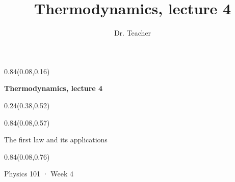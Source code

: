 \documentclass[aspectratio=169]{beamer}
\title{Thermodynamics, lecture 4}
\author{Dr. Teacher}
\begin{document}
\begin{frame}[t]

\begin{textblock}{0.84}(0.08,0.16)
{\centering\fontsize{32}{38}\selectfont \textcolor[HTML]{1A1A1A}{\textbf{Thermodynamics, lecture 4}}\par}
\end{textblock}

\begin{textblock}{0.24}(0.38,0.52)
\end{textblock}

\begin{textblock}{0.84}(0.08,0.57)
{\centering\fontsize{17}{20}\selectfont \textcolor[HTML]{555555}{The first law and its applications}\par}
\end{textblock}

\begin{textblock}{0.84}(0.08,0.76)
{\centering\fontsize{13}{16}\selectfont \textcolor[HTML]{555555}{Physics 101  ·  Week 4}\par}
\end{textblock}
\end{frame}
\end{document}
